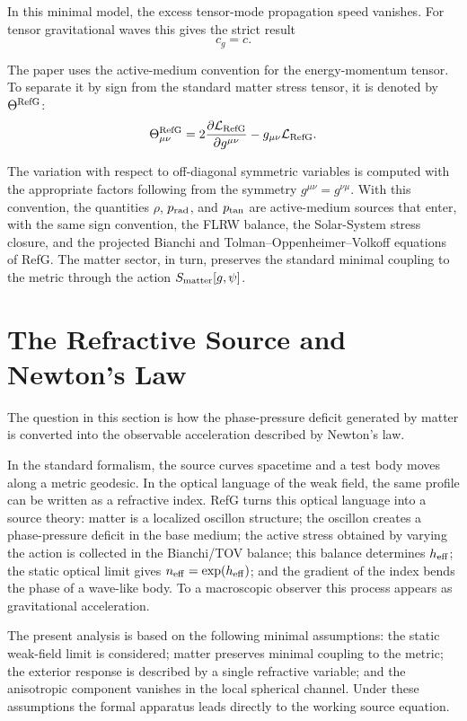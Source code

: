 \documentclass[12pt]{article}
\begin{document}
In this minimal model, the excess tensor-mode propagation speed vanishes. For tensor gravitational waves this gives the strict result
\begin{equation}
c_g=c .
\end{equation}

The paper uses the active-medium convention for the energy-momentum tensor. To separate it by sign from the standard matter stress tensor, it is denoted by $\Theta^{\rm RefG}$:
\begin{equation}
\Theta^{\rm RefG}_{\mu\nu}
=2\frac{\partial \mathcal L_{\rm RefG}}{\partial g^{\mu\nu}}
-g_{\mu\nu}\mathcal L_{\rm RefG} .
\end{equation}

The variation with respect to off-diagonal symmetric variables is computed with the appropriate factors following from the symmetry $g^{\mu\nu}=g^{\nu\mu}$. With this convention, the quantities $\rho$, $p_{\rm rad}$, and $p_{\rm tan}$ are active-medium sources that enter, with the same sign convention, the FLRW balance, the Solar-System stress closure, and the projected Bianchi and Tolman--Oppenheimer--Volkoff equations of RefG. The matter sector, in turn, preserves the standard minimal coupling to the metric through the action $S_{\rm matter}[g,\psi]$.

\section{The Refractive Source and Newton's Law}

The question in this section is how the phase-pressure deficit generated by matter is converted into the observable acceleration described by Newton's law.

In the standard formalism, the source curves spacetime and a test body moves along a metric geodesic. In the optical language of the weak field, the same profile can be written as a refractive index. RefG turns this optical language into a source theory: matter is a localized oscillon structure; the oscillon creates a phase-pressure deficit in the base medium; the active stress obtained by varying the action is collected in the Bianchi/TOV balance; this balance determines $h_{\rm eff}$; the static optical limit gives $n_{\rm eff}=\exp(h_{\rm eff})$; and the gradient of the index bends the phase of a wave-like body. To a macroscopic observer this process appears as gravitational acceleration.

The present analysis is based on the following minimal assumptions: the static weak-field limit is considered; matter preserves minimal coupling to the metric; the exterior response is described by a single refractive variable; and the anisotropic component vanishes in the local spherical channel. Under these assumptions the formal apparatus leads directly to the working source equation.
\end{document}
